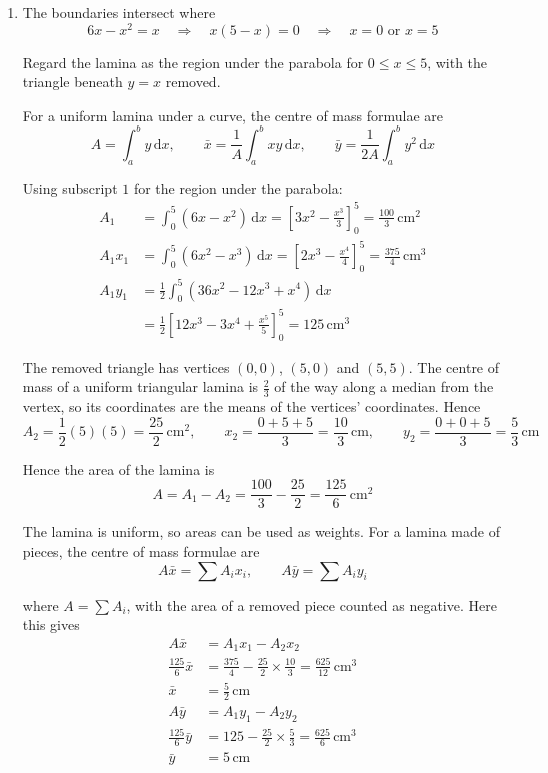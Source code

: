 \documentclass[leqno]{article}
\begin{document}
\begin{enumerate}[
  label=\textbf{\arabic*.},
  leftmargin=*,
  topsep=0pt,
  partopsep=0pt,
  parsep=0pt
]
\vspace*{10pt}

\begin{djsSolution}
\begin{enumerate}[label=\textbf{(\alph*)}, start=1]
\item The boundaries intersect where
\[
6x-x^2=x
\quad\Longrightarrow\quad
x(5-x)=0
\quad\Longrightarrow\quad
x=0\text{ or }x=5
\]

Regard the lamina as the region under the parabola for \(0\leq x\leq5\), with the triangle beneath \(y=x\) removed.

For a uniform lamina under a curve, the centre of mass formulae are
\[
A=\int_a^b y\,\mathrm{d}x,\qquad
\bar{x}=\frac{1}{A}\int_a^b xy\,\mathrm{d}x,\qquad
\bar{y}=\frac{1}{2A}\int_a^b y^2\,\mathrm{d}x
\]

Using subscript \(1\) for the region under the parabola:
\begin{align*}
A_1&=\int_0^5(6x-x^2)\,\mathrm{d}x
=\left[3x^2-\frac{x^3}{3}\right]_0^5
=\frac{100}{3}\,\mathrm{cm^2}\\
A_1x_1&=\int_0^5(6x^2-x^3)\,\mathrm{d}x
=\left[2x^3-\frac{x^4}{4}\right]_0^5
=\frac{375}{4}\,\mathrm{cm^3}\\
A_1y_1&=\frac12\int_0^5(36x^2-12x^3+x^4)\,\mathrm{d}x\\
&=\frac12\left[12x^3-3x^4+\frac{x^5}{5}\right]_0^5
=125\,\mathrm{cm^3}
\end{align*}

The removed triangle has vertices \((0,0)\), \((5,0)\) and \((5,5)\). The centre of mass of a uniform triangular lamina is \(\frac23\) of the way along a median from the vertex, so its coordinates are the means of the vertices' coordinates. Hence
\[
A_2=\frac12(5)(5)=\frac{25}{2}\,\mathrm{cm^2},\qquad
x_2=\frac{0+5+5}{3}=\frac{10}{3}\,\mathrm{cm},\qquad
y_2=\frac{0+0+5}{3}=\frac53\,\mathrm{cm}
\]

Hence the area of the lamina is
\[
A=A_1-A_2=\frac{100}{3}-\frac{25}{2}=\frac{125}{6}\,\mathrm{cm^2}
\]

The lamina is uniform, so areas can be used as weights. For a lamina made of pieces, the centre of mass formulae are
\[
A\bar{x}=\sum A_ix_i,\qquad
A\bar{y}=\sum A_iy_i
\]

where \(A=\sum A_i\), with the area of a removed piece counted as negative. Here this gives
\begin{align*}
A\bar{x}&=A_1x_1-A_2x_2\\
\frac{125}{6}\bar{x}&=\frac{375}{4}-\frac{25}{2}\times\frac{10}{3}
=\frac{625}{12}\,\mathrm{cm^3}\\
\bar{x}&=\frac52\,\mathrm{cm}\\
A\bar{y}&=A_1y_1-A_2y_2\\
\frac{125}{6}\bar{y}&=125-\frac{25}{2}\times\frac53
=\frac{625}{6}\,\mathrm{cm^3}\\
\bar{y}&=5\,\mathrm{cm}
\end{align*}


\end{enumerate}
\end{djsSolution}
\end{enumerate}
\end{document}
